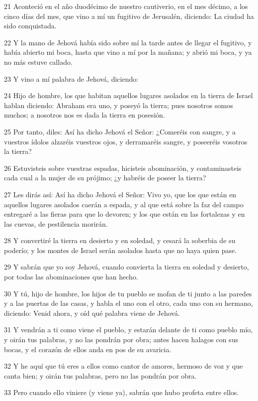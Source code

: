 \par 21 Aconteció en el año duodécimo de nuestro cautiverio, en el mes décimo, a los cinco días del mes, que vino a mí un fugitivo de Jerusalén, diciendo: La ciudad ha sido conquistada. 
\par 22 Y la mano de Jehová había sido sobre mí la tarde antes de llegar el fugitivo, y había abierto mi boca, hasta que vino a mí por la mañana; y abrió mi boca, y ya no más estuve callado.
\par 23 Y vino a mí palabra de Jehová, diciendo:
\par 24 Hijo de hombre, los que habitan aquellos lugares asolados en la tierra de Israel hablan diciendo: Abraham era uno, y poseyó la tierra; pues nosotros somos muchos; a nosotros nos es dada la tierra en posesión.
\par 25 Por tanto, diles: Así ha dicho Jehová el Señor: ¿Comeréis con sangre, y a vuestros ídolos alzaréis vuestros ojos, y derramaréis sangre, y poseeréis vosotros la tierra?
\par 26 Estuvisteis sobre vuestras espadas, hicisteis abominación, y contaminasteis cada cual a la mujer de su prójimo; ¿y habréis de poseer la tierra?
\par 27 Les dirás así: Así ha dicho Jehová el Señor: Vivo yo, que los que están en aquellos lugares asolados caerán a espada, y al que está sobre la faz del campo entregaré a las fieras para que lo devoren; y los que están en las fortalezas y en las cuevas, de pestilencia morirán.
\par 28 Y convertiré la tierra en desierto y en soledad, y cesará la soberbia de su poderío; y los montes de Israel serán asolados hasta que no haya quien pase.
\par 29 Y sabrán que yo soy Jehová, cuando convierta la tierra en soledad y desierto, por todas las abominaciones que han hecho.
\par 30 Y tú, hijo de hombre, los hijos de tu pueblo se mofan de ti junto a las paredes y a las puertas de las casas, y habla el uno con el otro, cada uno con su hermano, diciendo: Venid ahora, y oíd qué palabra viene de Jehová.
\par 31 Y vendrán a ti como viene el pueblo, y estarán delante de ti como pueblo mío, y oirán tus palabras, y no las pondrán por obra; antes hacen halagos con sus bocas, y el corazón de ellos anda en pos de su avaricia.
\par 32 Y he aquí que tú eres a ellos como cantor de amores, hermoso de voz y que canta bien; y oirán tus palabras, pero no las pondrán por obra.
\par 33 Pero cuando ello viniere (y viene ya), sabrán que hubo profeta entre ellos.

